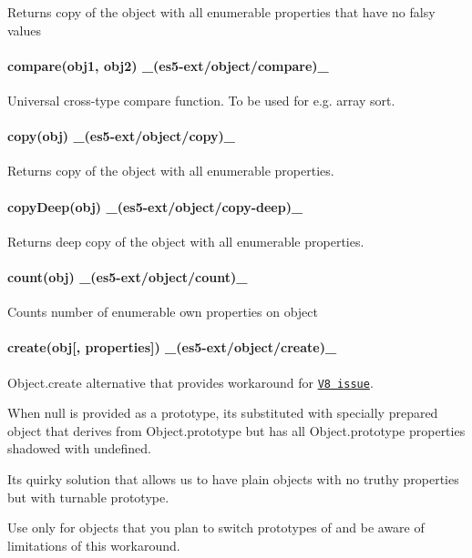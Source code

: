 Returns copy of the object with all enumerable properties that have no falsy values

\paragraph*{compare(obj1, obj2) \+\_\+(es5-\/ext/object/compare)\+\_\+}

Universal cross-\/type compare function. To be used for e.\+g. array sort.

\paragraph*{copy(obj) \+\_\+(es5-\/ext/object/copy)\+\_\+}

Returns copy of the object with all enumerable properties.

\paragraph*{copy\+Deep(obj) \+\_\+(es5-\/ext/object/copy-\/deep)\+\_\+}

Returns deep copy of the object with all enumerable properties.

\paragraph*{count(obj) \+\_\+(es5-\/ext/object/count)\+\_\+}

Counts number of enumerable own properties on object

\paragraph*{create(obj\mbox{[}, properties\mbox{]}) \+\_\+(es5-\/ext/object/create)\+\_\+}

{\ttfamily Object.\+create} alternative that provides workaround for \href{http://code.google.com/p/v8/issues/detail?id=2804}{\tt V8 issue}.

When {\ttfamily null} is provided as a prototype, it\textquotesingle{}s substituted with specially prepared object that derives from Object.\+prototype but has all Object.\+prototype properties shadowed with undefined.

It\textquotesingle{}s quirky solution that allows us to have plain objects with no truthy properties but with turnable prototype.

Use only for objects that you plan to switch prototypes of and be aware of limitations of this workaround.

